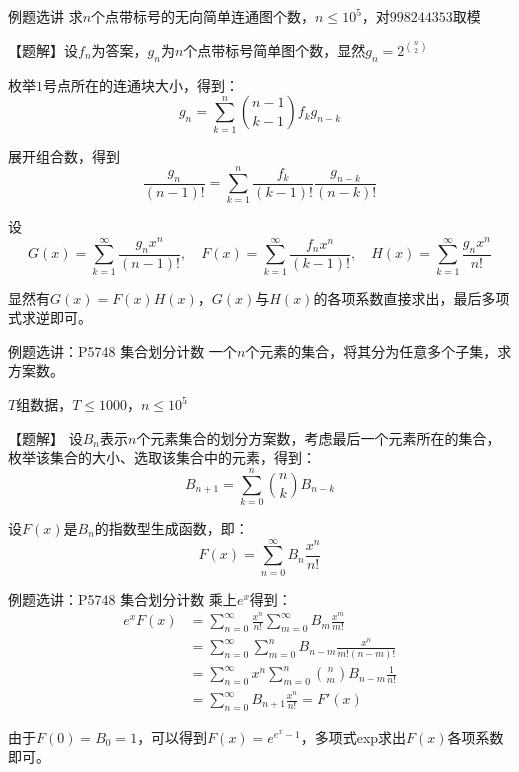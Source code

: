 \documentclass{beamer}
\begin{document}
\begin{frame}{例题选讲}
    \small
    求$n$个点带标号的无向简单连通图个数，$n\leq 10^5$，对$998244353$取模

    \vspace{1em}\pause
    【题解】设$f_n$为答案，$g_n$为$n$个点带标号简单图个数，显然$g_n=2^{\binom{n}{2}}$

    \pause
    枚举$1$号点所在的连通块大小，得到：
    \begin{equation*}
        g_n=\sum_{k=1}^n \binom{n-1}{k-1}f_k g_{n-k}
    \end{equation*}

    \pause
    展开组合数，得到
    \begin{equation*}
        \frac{g_n}{(n-1)!}=\sum_{k=1}^n \frac{f_k}{(k-1)!} \frac{g_{n-k}}{(n-k)!}
    \end{equation*}

    \pause
    设
    \begin{equation*}
        G(x)=\sum_{k=1}^\infty \frac{g_n x^n}{(n-1)!},\quad F(x)=\sum_{k=1}^\infty \frac{f_n x^n}{(k-1)!},\quad H(x)=\sum_{k=1}^\infty \frac{g_n x^n}{n!}
    \end{equation*}

    显然有$G(x)=F(x)H(x)$，$G(x)$与$H(x)$的各项系数直接求出，最后多项式求逆即可。
\end{frame}

\begin{frame}{例题选讲：P5748 集合划分计数}
    \small
    一个$n$个元素的集合，将其分为任意多个子集，求方案数。

    $T$组数据，$T\leq 1000$，$n\leq 10^5$

    \vspace{1em}\pause
    【题解】 设$B_n$表示$n$个元素集合的划分方案数，考虑最后一个元素所在的集合，枚举该集合的大小、选取该集合中的元素，得到：
    \begin{equation*}
        B_{n+1}=\sum_{k=0}^{n}\binom{n}{k}B_{n-k}
    \end{equation*}

    \pause
    设$F(x)$是$B_n$的指数型生成函数，即：
    \begin{equation*}
        F(x)=\sum_{n= 0}^\infty B_n \frac{x^n}{n!}
    \end{equation*}
\end{frame}

\begin{frame}{例题选讲：P5748 集合划分计数}
    \small
    乘上$e^x$得到：
    \begin{align*}
        e^xF(x)&=\sum_{n= 0}^\infty \frac{x^n}{n!} \sum_{m= 0}^\infty B_m \frac{x^m}{m!}\\
        &= \sum_{n= 0}^\infty \sum_{m = 0}^n B_{n-m} \frac{x^n}{m!(n-m)!}\\
        &= \sum_{n= 0}^\infty x^n \sum_{m = 0}^n \binom{n}{m} B_{n-m} \frac{1}{n!}\\
        &= \sum_{n= 0}^\infty B_{n+1} \frac{x^n}{n!}= F'(x)
    \end{align*}

    \pause
    由于$F(0)=B_0=1$，可以得到$F(x)=e^{e^x-1}$，多项式exp求出$F(x)$各项系数即可。
\end{frame}
\end{document}
